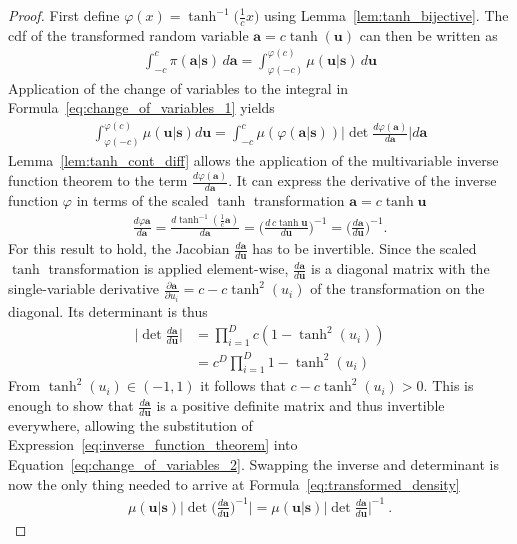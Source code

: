 \begin{proof}
First define $\varphi (x) = \tanh^{-1} \Big(\frac{1}{c} x \Big)$ using Lemma~\ref{lem:tanh_bijective}. The \gls{cdf} of the transformed random variable $\mathbf a = c \tanh (\mathbf u)$ can then be written as
\begin{gather}\label{eq:change_of_variables_1}
    \int_{-c}^{c } \pi (\mathbf a | \mathbf s) \, d \mathbf a  =  \int_{\varphi(-c)}^{\varphi(c)} \mu ( \mathbf u | \mathbf s)  \, d \mathbf u
\end{gather}
Application of the change of variables to the integral in Formula~\ref{eq:change_of_variables_1} yields
\begin{gather}\label{eq:change_of_variables_2}
    \int_{\varphi(-c)}^{\varphi(c)} \mu (\mathbf u | \mathbf s) d \mathbf u  =  \int_{-c}^{c} \mu (\varphi (\mathbf a | \mathbf s)) \bigg| \det \frac{d \varphi (\mathbf a) }{d \mathbf a} \bigg| d \mathbf a  
\end{gather}
Lemma~\ref{lem:tanh_cont_diff} allows the application of the multivariable inverse function theorem to the term $\frac{d \varphi (\mathbf a) }{d \mathbf a}$. It can express the derivative of the inverse function $\varphi$ in terms of the scaled $\tanh$ transformation $\mathbf a = c \tanh\mathbf u$
\begin{gather}\label{eq:inverse_function_theorem}
    \frac{d \varphi \mathbf a}{d \mathbf a} = \frac{d \tanh^{-1} (\frac{1}{c} \mathbf a)}{d \mathbf a} = \bigg( \frac{d \, c \tanh\mathbf u}{d \mathbf u} \bigg)^{-1} = \bigg( \frac{d \mathbf a}{d \mathbf u} \bigg)^{-1}.
\end{gather}
For this result to hold, the Jacobian $\frac{d \mathbf a}{d \mathbf u}$ has to be invertible. Since the scaled $\tanh$ transformation is applied element-wise, $\frac{d \mathbf a}{d \mathbf u}$ is a diagonal matrix with the single-variable derivative $\frac{\partial \mathbf a}{\partial u_i} = c - c \tanh^2(u_i)$ of the transformation on the diagonal. Its determinant is thus
\begin{align}
    \bigg| \det \frac{d \mathbf a}{d \mathbf u} \bigg| & = \prod_{i=1}^D c (1 -  \tanh^2(u_i)) \nonumber \\
    & = c^D \prod_{i=1}^D 1 -  \tanh^2(u_i)
\end{align}
From $\tanh^2(u_i) \in (-1, 1)$ it follows that $c - c \tanh^2(u_i) > 0$. This is enough to show that $ \frac{d \mathbf a}{d \mathbf u}$ is a positive definite matrix and thus invertible everywhere, allowing the substitution of Expression~\ref{eq:inverse_function_theorem} into Equation~\ref{eq:change_of_variables_2}.
Swapping the inverse and determinant is now the only thing needed to arrive at Formula~\ref{eq:transformed_density}
\begin{gather}
   \mu ( \mathbf u | \mathbf s) \bigg| \det \bigg( \frac{d \mathbf a}{d \mathbf u} \bigg)^{-1} \bigg| = \mu ( \mathbf u | \mathbf s) \bigg| \det \frac{d \mathbf a}{d \mathbf u} \bigg|^{-1}~.
\end{gather}
\end{proof}


